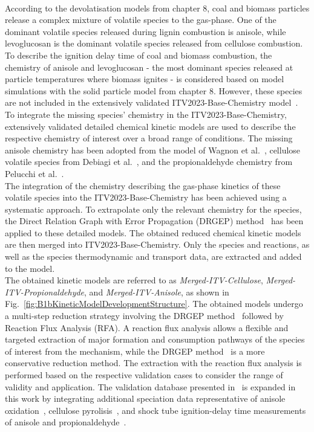 \begin{refsection}
\begin{figure}[h]
\end{figure}
\\
According to the devolatisation models from chapter 8, coal and biomass particles release a complex mixture of volatile species to the gas-phase. One of the dominant volatile species released during lignin combustion is anisole, while levoglucosan is the dominant volatile species released from cellulose combustion. To describe the ignition delay time of coal and biomass combustion, the chemistry of anisole and levoglucosan - the most dominant species released at particle temperatures where biomass ignites - is considered based on model simulations with the solid particle model from chapter 8. However, these species are not included in the extensively validated ITV2023-Base-Chemistry model~\cite{Langer2023}. To integrate the missing species' chemistry in the ITV2023-Base-Chemistry, extensively validated detailed chemical kinetic models are used to describe the respective chemistry of interest over a broad range of conditions. The missing anisole chemistry has been adopted from the model of Wagnon et al.~\cite{Wagnon2018}, cellulose volatile species from Debiagi et al.~\cite{Debiagi2016}, and the propionaldehyde chemistry from Pelucchi et al.~\cite{Pelucchi2015}.
\\
The integration of the chemistry describing the gas-phase kinetics of these volatile species into the ITV2023-Base-Chemistry has been achieved using a systematic approach. To extrapolate only the relevant chemistry for the species, the Direct Relation Graph with Error Propagation (DRGEP) method~\cite{PepiotDesjardins2008} has been applied to these detailed models. The obtained reduced chemical kinetic models are then merged into ITV2023-Base-Chemistry. Only the species and reactions, as well as the species thermodynamic and transport data, are extracted and added to the model.
\\
The obtained kinetic models are referred to as \textit{Merged-ITV-Cellulose}, \textit{Merged-ITV-Propionaldehyde}, and \textit{Merged-ITV-Anisole}, as shown in Fig.~\ref{fig:B1bKineticModelDevelopmentStructure}. The obtained models undergo a multi-step reduction strategy involving the DRGEP method~\cite{PepiotDesjardins2008a} followed by Reaction Flux Analysis (RFA). A reaction flux analysis allows a flexible and targeted extraction of major formation and consumption pathways of the species of interest from the mechanism, while the DRGEP method~\cite{PepiotDesjardins2008a} is a more conservative reduction method. The extraction with the reaction flux analysis is performed based on the respective validation cases to consider the range of validity and application. The validation database presented in~\cite{Langer2023} is expanded in this work by integrating additional speciation data representative of anisole oxidation~\cite{Chen2022}, cellulose pyrolisis~\cite{Norinaga2013}, and shock tube ignition-delay time measurements of anisole and propionaldehyde~\cite{Pelucchi2015, AkihKumgeh2011}.

\end{refsection}
